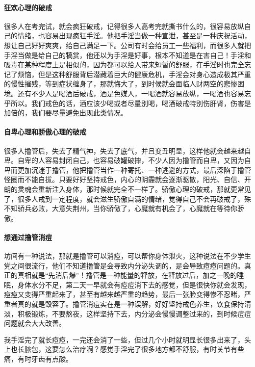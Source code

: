 \paragraph{狂欢心理的破戒}

很多人在考完试，就会疯狂破戒，记得很多人高考完就撕书什么的，很容易放纵自己的情绪，也容易出现疯狂手淫。他把手淫当做一种宣泄，甚至是一种庆祝活动，想让自己好好爽爽，给自己满足一下。公司有时会给员工一些福利，而很多人就把手淫当做是给自己的犒赏，他还以为手淫是好事，根本不知道是在害自己！手淫和吸毒在某种程度上是相似的，因为都可以给人带来短暂的舒服，在手淫时也完全忘记了烦恼，但是这种舒服背后潜藏着巨大的健康危机，手淫会对身心造成极其严重的慢性摧残，等到症状缠身了，那就悔大了，到时候就会面临人财两空的悲惨困境。还有不少人是喝酒后破戒，酒是色媒人，一喝酒就容易放纵，一喝酒也容易忘乎所以。我们戒色的话，酒应该少喝或者尽量别喝，喝酒破戒特别伤肝肾，伤害是加倍的，我们要尽量避免出现此类情况。

\paragraph{自卑心理和骄傲心理的破戒}

很多人撸管后，失去了精气神，失去了底气，并且变丑明显，这样他就会越来越自卑。自卑的人容易封闭自己，也容易破罐破摔，不少人因为撸管而自卑，又因为自卑而更加沉迷于撸管，他把撸管当作一种寄托、一种逃避的方式，最后深陷于撸管怪圈而不能自拔。只要好好坚持戒色，内心的阴霾就会逐渐驱散，阳光、自信、开朗的灵魂会重新注入身体，那时候就完全不一样了。骄傲心理的破戒，那就更常见了，很多人戒到一定程度，就会滋生骄傲自满的情绪，觉得自己不会再破戒了，殊不知骄兵必败，大意失荆州，当你骄傲了，心魔就有机会了，心魔就在等待你骄傲。

\paragraph{想通过撸管消痘}

坊间有一种说法，那就是撸管可以消痘，可以帮你身体泄火，这种说法在不少学生党之间很流行，他们不知道撸管是会导致内分泌失调的，是会导致痘痘问题的。真正的真相就是“先消后爆”！撸管是一种能量的释放，在释放过后，加之一晚的睡眠，身体水分不足，第二天一早就会有痘痘消下去的感觉，但是很快你就会发现，痘痘又变得严重起来了，甚至有越来越严重的趋势，最后一张脸变得惨不忍睹，严重者真的就是毁容了。撸管消痘实在是一种误解，好好坚持戒色养生，饮食保持清淡，积极锻炼，不要熬夜，这样坚持下去，内分泌会慢慢调整过来的，到时候痘痘问题就会大大改善。

\begin{case}
    我手淫完了就长痘痘，一完还会消了一些，但过几个小时就明显长很多出来了，头上也长脓包，这要怎么治疗啊？感觉手淫完了很多地方都不舒服，有时关节有些痛，有时牙齿有点酸。
\end{case}


